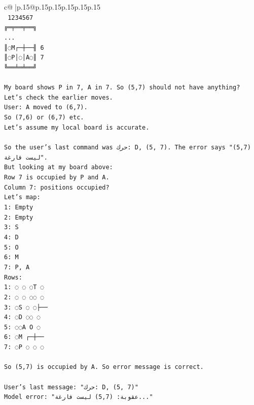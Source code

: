 \documentclass{article}
\begin{document}
{\begin{supertabular}{c@{$\;$}|p{.15\linewidth}@{}p{.15\linewidth}p{.15\linewidth}p{.15\linewidth}p{.15\linewidth}p{.15\linewidth}}
{{{\\ 
\texttt{ 1234567} \\
\texttt{╔═╤══╤══╗} \\
\texttt{...} \\
\texttt{║◌M┌─┼──╢ 6} \\
\texttt{║◌P│◌│A◌║ 7} \\
\texttt{╚══╧═╧══╝} \\
\\ 
\texttt{My board shows P in 7, A in 7. So (5,7) should not have anything? Let's check the earlier moves.} \\
\texttt{User: A moved to (6,7).} \\
\texttt{So (7,6) or (6,7) etc.} \\
\texttt{Let's assume my local board is accurate.} \\
\\ 
\texttt{So the user's last command was حرك: D, (5, 7). The error says "(5,7) ليست فارغة".} \\
\texttt{But looking at my board above:} \\
\texttt{Row 7 is occupied by P and A.} \\
\texttt{Column 7: positions occupied?} \\
\texttt{Let's map:} \\
\texttt{1: Empty} \\
\texttt{2: Empty} \\
\texttt{3: S} \\
\texttt{4: D} \\
\texttt{5: O} \\
\texttt{6: M} \\
\texttt{7: P, A} \\
\texttt{Rows:} \\
\texttt{1: ◌ ◌ ◌T ◌} \\
\texttt{2: ◌ ◌ ◌◌ ◌} \\
\texttt{3: ◌S ◌ ◌├──} \\
\texttt{4: ◌D ◌◌ ◌} \\
\texttt{5: ◌◌A O ◌} \\
\texttt{6: ◌M ┌─┼──} \\
\texttt{7: ◌P ◌ ◌ ◌} \\
\\ 
\texttt{So (5,7) is occupied by A. So error message is correct.} \\
\\ 
\texttt{User's last message: "حرك: D, (5, 7)"} \\
\texttt{Model error: "عقوبة: (5,7) ليست فارغة..."} \\
}}}
\end{supertabular}}
\end{document}
